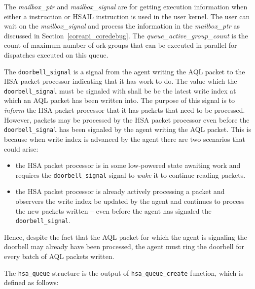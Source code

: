 The {\itshape mailbox\_ptr} and {\itshape mailbox\_signal} are for
getting execution information when either a 
instruction or  HSAIL instruction is used in the user
kernel. The user can wait on the {\itshape mailbox\_signal} and
process the information in the {\itshape mailbox\_ptr} as discussed
in Section~\ref{coreapi_coredebug}. The {\itshape
queue\_active\_group\_count} is the count of maximum number of
ork-groups that can be executed in parallel for dispatches executed
on this queue.

The \texttt{doorbell\_signal} is a signal from the agent writing the
AQL packet to the HSA packet processor indicating that it has work
to do. The value which the \texttt{doorbell\_signal} must be
signaled with shall be be the latest write index at
which an AQL packet has been written into.  The purpose of this
signal is to \emph{inform} the HSA packet processor that it has
packets that need to be processed. However, packets may be processed
by the HSA packet processor even before the
\texttt{doorbell\_signal} has been signaled by the agent writing the
AQL packet.  This is because when write index is advanced by the
agent there are two scenarios that could arise: 

\begin{itemize}
        \item the HSA packet processor is in some low-powered state
                awaiting work and requires the
                \texttt{doorbell\_signal} signal to \emph{wake} it
                to continue reading packets.
        \item the H\-S\-A
                packet processor is already actively processing a
                packet  and observers the write index be
                updated by the agent and continues to process the
                new packets written -- even before the agent has
                signaled the \texttt{doorbell\_signal}. 
\end{itemize}

Hence, despite the fact that the AQL packet for which the agent is
signaling the doorbell may already have been processed, the agent
must ring the doorbell for every batch of AQL packets written. 

The \texttt{hsa\_queue} structure is the output of
\texttt{hsa\_queue\_create} function, which is defined as
follows:



